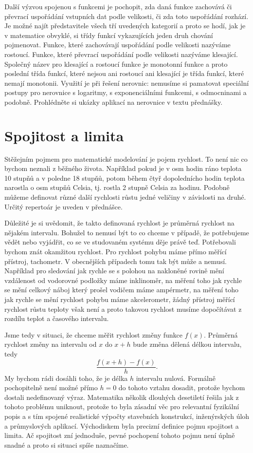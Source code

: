 \documentclass[12pt]{article}
\begin{document}
Další výzvou spojenou s funkcemi je pochopit, zda daná funkce zachovává či převrací uspořádání vstupních dat podle velikosti, či zda toto uspořádání rozhází. Je možné najít představitele všech tří uvedených kategorií a proto se hodí, jak je v matematice obvyklé, si třídy funkcí vykazujících jeden druh chování pojmenovat. Funkce, které zachovávají uspořádání podle velikosti nazýváme rostoucí. Funkce, které převrací uspořádání podle velikosti nazýváme klesající. Společný název pro klesající a rostoucí funkce je monotonní funkce a proto poslední třída funkcí, které nejsou ani rostoucí ani klesající je třída funkcí, které nemají monotonii. Využití je při řešení nerovnic: nemusíme si pamatovat speciální postupy pro nerovnice s logaritmy, s exponenciálními funkcemi, s odmocninami a podobně. Prohlédněte si ukázky aplikací na nerovnice v textu přednášky.

\newpage
\section*{Spojitost a limita}

Stěžejním pojmem pro matematické modelování je pojem rychlost. To není nic co bychom neznali z běžného života. Například pokud je v osm hodin ráno teplota 10 stupňů a v poledne 18 stupňů, potom během čtyř dopolednícho hodin teplota narostla o osm stupňů Celsia, tj. rostla 2 stupně Celsia za hodinu. Podobně můžeme definovat různé další rychlosti růstu jedné veličiny v závislosti na druhé. Určitý repertoár je uveden v přednášce.

Důležité je si uvědomit, že takto definovaná rychlost je průměrná rychlost na nějakém intervalu. Bohužel to nemusí být to co chceme v případě, že potřebujeme vědět nebo vyjádřit, co se ve studovaném systému děje právě teď. Potřebovali bychom znát okamžitou rychlost. Pro rychlost pohybu máme přímo měřící přístroj, tachometr. V obecnějších případech tomu tak být může a nemusí. Například pro sledování jak rychle se s polohou na nakloněné rovině mění vzdálenost od vodorovné podložky máme inklinoměr, na měření toho jak rychle se mění celkový náboj který prošel vodičem máme ampérmetr, na měření toho jak rychle se mění rychlost pohybu máme akcelerometr, žádný přístroj měřící rychlost růstu teploty však není a proto takovou rychlost musíme dopočítávat z rozdílu teplot a časového intervalu.

Jsme tedy v situaci, že chceme měřit rychlost změny funkce $f(x)$. Průměrná rychlost změny na intervalu od $x$ do $x+h$ bude změna dělená délkou intervalu, tedy $$\frac{f(x+h)-f(x)}{h}.$$ My bychom rádi dosáhli toho, že je délka $h$ intervalu nulová. Formálně pochopitelně není možné přímo $h=0$ do tohoto vztahu dosadit, protože bychom dostali nedefinovaný výraz. Matematika několik dlouhých desetiletí řešila jak z tohoto problému uniknout, protože to byla zásadní věc pro relevantní fyzikální popis a s tím spojené realistické výpočty stavebních konstrukcí, inženýrských úloh a průmyslových aplikací. Východiskem byla precizní definice pojmu spojitost a limita. Ač spojitost zní jednoduše, pevné pochopení tohoto pojmu není úplně snadné a proto si situaci spíše naznačíme.
\end{document}
